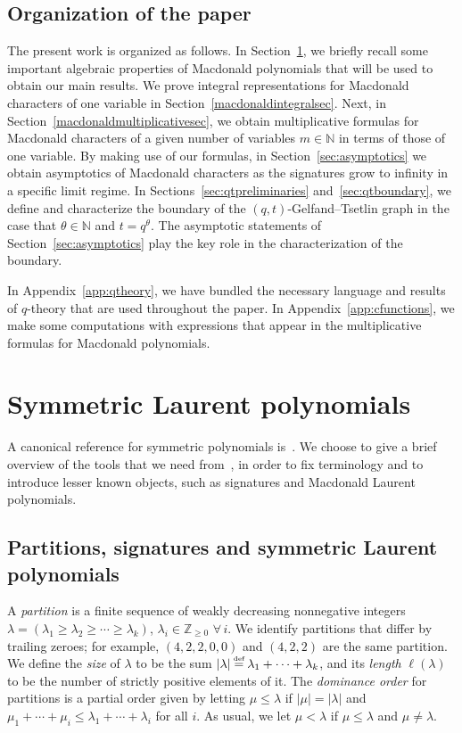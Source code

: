 \documentclass[pdftex]{sigma}
\numberwithin{equation}{section}
\newcommand\myeq{\mathrel{\stackrel{\makebox[0pt]{\mbox{\normalfont\tiny def}}}{=}}}
\newcommand{\Z}{\mathbb{Z}}
\newcommand{\N}{\mathbb{N}}
\begin{document}
\subsection{Organization of the paper}

The present work is organized as follows. In Section~\ref{macdonaldsection}, we brief\/ly recall some important algebraic properties of Macdonald polynomials that will be used to obtain our main results. We prove integral representations for Macdonald characters of one variable in Section~\ref{macdonaldintegralsec}. Next, in Section~\ref{macdonaldmultiplicativesec}, we obtain multiplicative formulas for Macdonald characters of a given number of variables $m\in\N$ in terms of those of one variable.
By making use of our formulas, in Section~\ref{sec:asymptotics} we obtain asymptotics of Macdonald characters as the signatures grow to inf\/inity in a specif\/ic limit regime. In Sections~\ref{sec:qtpreliminaries} and~\ref{sec:qtboundary}, we def\/ine and characterize the boundary of the $(q, t)$-Gelfand--Tsetlin graph in the case that $\theta\in\N$ and $t = q^{\theta}$. The asymptotic statements of Section~\ref{sec:asymptotics} play the key role in the characterization of the boundary.

In Appendix~\ref{app:qtheory}, we have bundled the necessary language and results of $q$-theory that are used throughout the paper. In Appendix~\ref{app:cfunctions}, we make some computations with expressions that appear in the multiplicative formulas for Macdonald polynomials.


\section{Symmetric Laurent polynomials}\label{macdonaldsection}

A canonical reference for symmetric polynomials is~\cite{M2}. We choose to give a brief overview of the tools that we need from~\cite{M2}, in order to f\/ix terminology and to introduce lesser known objects, such as signatures and Macdonald Laurent polynomials.

\subsection{Partitions, signatures and symmetric Laurent polynomials}

A \textit{partition} is a f\/inite sequence of weakly decreasing nonnegative integers $\lambda = (\lambda_1 \geq \lambda_2 \geq \cdots\geq \lambda_k)$, $\lambda_i\in\Z_{\geq 0}$ $\forall\, i$. We identify partitions that dif\/fer by trailing zeroes; for example, $(4, 2, 2, 0, 0)$ and $(4, 2, 2)$ are the same partition. We def\/ine the \textit{size} of $\lambda$ to be the sum $|\lambda| \myeq \lambda_1 + \dots + \lambda_k$, and its \textit{length} $\ell(\lambda)$ to be the number of strictly positive elements of it.
The \textit{dominance order} for partitions is a partial order given by letting $\mu \leq \lambda$ if $|\mu| = |\lambda|$ and $\mu_1 + \cdots + \mu_i \leq \lambda_1 + \cdots + \lambda_i$ for all $i$. As usual, we let $\mu < \lambda$ if $\mu \leq \lambda$ and $\mu \neq \lambda$.
\end{document}
